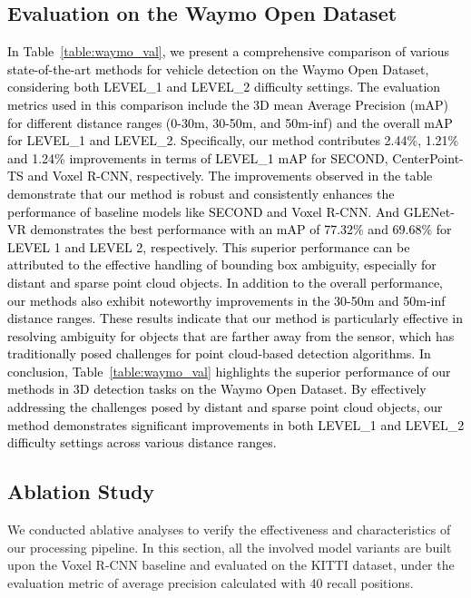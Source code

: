 \documentclass[twocolumn]{svjour3}
\newcommand{\revise}[1]{\textcolor{black}{#1}}
\begin{document}
\subsection{Evaluation on the Waymo Open Dataset} \label{exp_on_waymo}
\revise{
In Table~\ref{table:waymo_val}, we present a comprehensive comparison of various state-of-the-art methods for vehicle detection on the Waymo Open Dataset, considering both LEVEL\_1 and LEVEL\_2 difficulty settings. 
The evaluation metrics used in this comparison include the 3D mean Average Precision (mAP) for different distance ranges (0-30m, 30-50m, and 50m-inf) and the overall mAP for LEVEL\_1 and LEVEL\_2.
Specifically, our method contributes 2.44\%, 1.21\% and 1.24\% improvements in terms of LEVEL\_1 mAP for SECOND, CenterPoint-TS and Voxel R-CNN, respectively. The improvements observed in the table demonstrate that our method is robust and consistently enhances the performance of baseline models like SECOND and Voxel R-CNN.
And GLENet-VR demonstrates the best performance with an mAP of 77.32\% and 69.68\% for LEVEL 1 and LEVEL 2, respectively. This superior performance can be attributed to the effective handling of bounding box ambiguity, especially for distant and sparse point cloud objects.
In addition to the overall performance, our methods also exhibit noteworthy improvements in the 30-50m and 50m-inf distance ranges. These results indicate that our method is particularly effective in resolving ambiguity for objects that are farther away from the sensor, which has traditionally posed challenges for point cloud-based detection algorithms.
In conclusion, Table~\ref{table:waymo_val} highlights the superior performance of our methods in 3D detection tasks on the Waymo Open Dataset. By effectively addressing the challenges posed by distant and sparse point cloud objects, our method demonstrates significant improvements in both LEVEL\_1 and LEVEL\_2 difficulty settings across various distance ranges.}

\subsection{Ablation Study} \label{ablation_study}
We conducted ablative analyses to verify the effectiveness and characteristics of our processing pipeline. In this section, all the involved model variants are built upon the Voxel R-CNN baseline and evaluated on the KITTI dataset, under the evaluation metric of average precision calculated with 40 recall positions.
\end{document}
